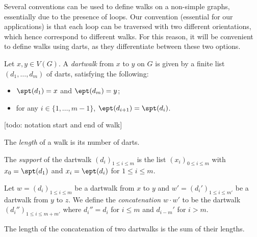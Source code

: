 Several conventions can be used to define walks on a non-simple graphs, essentially
due to the presence of loops. Our convention (essential for our applications)
is that each loop can be traversed with two different orientations, which hence
correspond to different walks. For this reason, it will be convenient to define
walks using darts, as they differentiate between these two options.

\begin{definition}
  \label{def:dartwalk}
  \leanok
  Let $x, y \in V(G)$. A \emph{dartwalk} from $x$ to $y$ on $G$ is given by a finite list
  $(d_1, \ldots, d_m)$ of darts, satisfying the following:
    \begin{itemize}
      \item $\spt(d_1)=x$ and $\ept(d_m)=y$;
      \item for any $i \in \{1, \ldots, m-1\}$, $\ept(d_{i+1}) = \spt(d_i)$.
    \end{itemize}
\end{definition}

[todo: notation start and end of walk]

\begin{definition}
  \label{def:length}
  \leanok
  The \emph{length} of a walk is its number of darts.
\end{definition}

\begin{definition}
  \label{def:dartwalk_support}
  \leanok
  The \emph{support} of the dartwalk $(d_i)_{1 \leq i \leq m}$
  is the list $(x_i)_{0 \leq i \leq m}$ with $x_0=\spt(d_1)$ and
  $x_i = \ept(d_i)$ for $1 \leq i \leq m$.
\end{definition}

\begin{definition}
  \label{def:concatenation}
  Let $w = (d_i)_{1 \leq i \leq m}$ be a dartwalk from $x$ to $y$
  and $w' = (d_i')_{1 \leq i \leq m'}$ be a dartwalk from $y$ to $z$.
  We define the \emph{concatenation} $w \cdot w'$ to be the dartwalk $(d_i'')_{1 \leq i \leq m+m'}$
  where $d_i''=d_i$ for $i \leq m$ and $d_{i-m}'$ for $i > m$.
\end{definition}

\begin{lemma}
  \label{lem:length_concat}
  The length of the concatenation of two dartwalks is the sum of their lengths.
\end{lemma}

